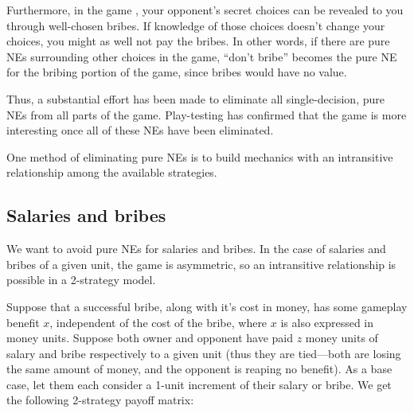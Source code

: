 Furthermore, in the game \gtitle, your opponent's secret choices can be revealed to you through well-chosen bribes.  If knowledge of those choices doesn't change your choices, you might as well not pay the bribes.  In other words, if there are pure NEs surrounding other choices in the game, ``don't bribe'' becomes the pure NE for the bribing portion of the game, since bribes would have no value.

Thus, a substantial effort has been made to eliminate all single-decision, pure NEs from all parts of the game.  Play-testing has confirmed that the game is more interesting once all of these NEs have been eliminated.

One method of eliminating pure NEs is to build mechanics with an intransitive relationship among the available strategies.


\subsection{Salaries and bribes}
We want to avoid pure NEs for salaries and bribes.  In the case of salaries and bribes of a given unit, the game is asymmetric, so an intransitive relationship is possible in a 2-strategy model.

Suppose that a successful bribe, along with it's cost in money, has some gameplay benefit $x$, independent of the cost of the bribe, where $x$ is also expressed in money units.  Suppose both owner and opponent have paid $z$ money units of salary and bribe respectively to a given unit (thus they are tied---both are losing the same amount of money, and the opponent is reaping no benefit).  As a base case, let them each consider a 1-unit increment of their salary or bribe.  We get the following 2-strategy payoff matrix:

\newcommand{\subtablesep}{\tabcolsep}
\newcommand{\maintablesep}{0.04in}
\renewcommand{\tabcolsep}{\maintablesep}

\newcommand{\payoff}[5]{
\begin{tabular}{cc}
{\sc #3}&{\sc #4}\\
(#1)&(#2)\\
\multicolumn{2}{c}{{\sc #5}}
\end{tabular}
}


